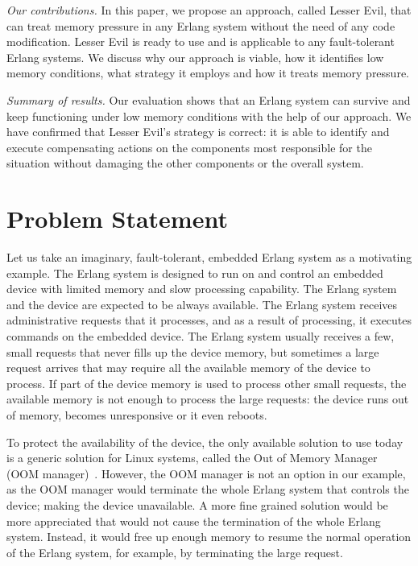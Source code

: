 \documentclass{llncs}
\begin{document}
\emph{Our contributions.} %
In this paper, we propose an approach, called Lesser Evil, that can treat memory pressure in any Erlang system without the need of any code modification. Lesser Evil is ready to use and is applicable to any fault-tolerant Erlang systems. We discuss why our approach is viable, how it identifies low memory conditions, what strategy it employs and how it treats memory pressure.

\emph{Summary of results.} Our evaluation shows that an Erlang system can survive and keep functioning under low memory conditions with the help of our approach. We have confirmed that Lesser Evil's strategy is correct: it is able to identify and execute compensating actions on the components most responsible for the situation without damaging the other components or the overall system.

\section{Problem Statement}

Let us take an imaginary, fault-tolerant, embedded Erlang system as a motivating example. The Erlang system is designed to run on and control an embedded device with limited memory and slow processing capability. The Erlang system and the device are expected to be always available. The Erlang system receives administrative requests that it processes, and as a result of processing, it executes commands on the embedded device. The Erlang system usually receives a few, small requests that never fills up the device memory, but sometimes a large request arrives that may require all the available memory of the device to process. If part of the device memory is used to process other small requests, the available memory is not enough to process the large requests: the device runs out of memory, becomes unresponsive or it even reboots.

To protect the availability of the device, the only available solution to use today is a generic solution for Linux systems, called the Out of Memory Manager (OOM manager)~\cite{oom}. However, the OOM manager is not an option in our example, as the OOM manager would terminate the whole Erlang system that controls the device; making the device unavailable. A more fine grained solution would be more appreciated that would not cause the termination of the whole Erlang system. Instead, it would free up enough memory to resume the normal operation of the Erlang system, for example, by terminating the large request.
\end{document}
